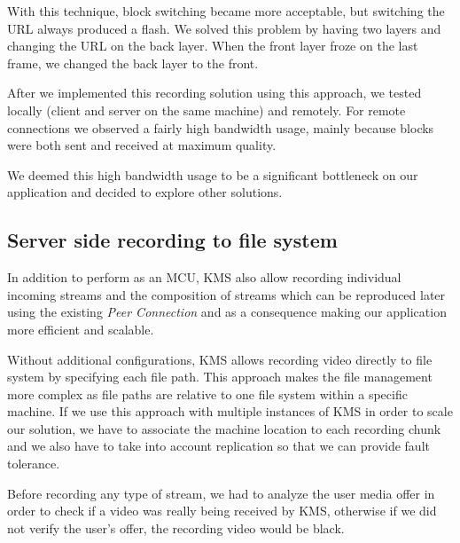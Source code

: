         With this technique, block switching became more acceptable, but switching the \ac{URL} always produced a flash. We solved this problem by having two layers and changing the \ac{URL} on the back layer. When the front layer froze on the last frame, we changed the back layer to the front. 

	After we implemented this recording solution using this approach, we tested locally (client and server on the same machine) and remotely. For remote connections we observed a fairly high bandwidth usage, mainly because blocks were both sent and received at maximum quality.

	We deemed this high bandwidth usage to be a significant bottleneck on our application and decided to explore other solutions.

        
\subsection{Server side recording to file system}

In addition to perform as an \ac{MCU}, \ac{KMS} also allow recording individual incoming streams and the composition of streams which can be reproduced later using the existing \emph{Peer Connection} and as a consequence making our application more efficient and scalable.

Without additional configurations, \ac{KMS} allows recording video directly to file system by specifying each file path. This approach makes the file management more complex as file paths are relative to one file system within a specific machine. If we use this approach with multiple instances of \ac{KMS} in order to scale our solution, we have to associate the machine location to each recording chunk and we also have to take into account replication so that we can provide fault tolerance.


Before recording any type of stream, we had to analyze the user media offer in order to check if a video was really being received by \ac{KMS}, otherwise if we did not verify the user's offer, the recording video would be black.

